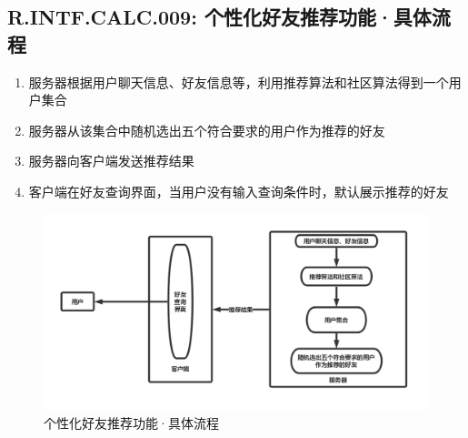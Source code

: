     \subsection{R.INTF.CALC.009: 个性化好友推荐功能·具体流程}
    \begin{enumerate}
        \item 服务器根据用户聊天信息、好友信息等，利用推荐算法和社区算法得到一个用户集合
        \item 服务器从该集合中随机选出五个符合要求的用户作为推荐的好友
        \item 服务器向客户端发送推荐结果
        \item 客户端在好友查询界面，当用户没有输入查询条件时，默认展示推荐的好友
    \end{enumerate}
    \newpage
        \begin{figure}[h]
            \centering
            \includegraphics[scale=0.4]{OutlineDesign/figures/个性化好友推荐功能·具体流程.png}
            \caption{个性化好友推荐功能·具体流程}
            \label{fig:server_flow}
        \end{figure}
